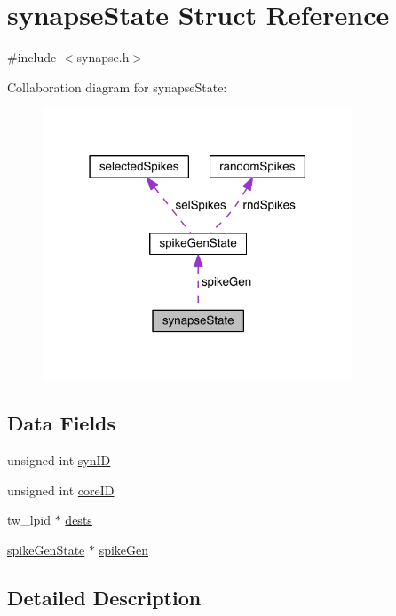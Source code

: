 \hypertarget{structsynapse_state}{}\section{synapse\+State Struct Reference}
\label{structsynapse_state}


{\ttfamily \#include $<$synapse.\+h$>$}



Collaboration diagram for synapse\+State\+:\nopagebreak
\begin{figure}[H]
\begin{center}
\leavevmode
\includegraphics[width=262pt]{structsynapse_state__coll__graph}
\end{center}
\end{figure}
\subsection*{Data Fields}
\begin{DoxyCompactItemize}
\item 
unsigned int \hyperlink{structsynapse_state_aef661be02823d13d471c66bf0cd478db}{syn\+I\+D}
\item 
unsigned int \hyperlink{structsynapse_state_a2063050696509e31bdd72dbb0607c6ee}{core\+I\+D}
\item 
tw\+\_\+lpid $\ast$ \hyperlink{structsynapse_state_a6d6a80692ca06baa6c9a11a624129763}{dests}
\item 
\hyperlink{structspike_gen_state}{spike\+Gen\+State} $\ast$ \hyperlink{structsynapse_state_a11fd4dc41f715eb6f04a68bc5fc9e292}{spike\+Gen}
\end{DoxyCompactItemize}


\subsection{Detailed Description}


